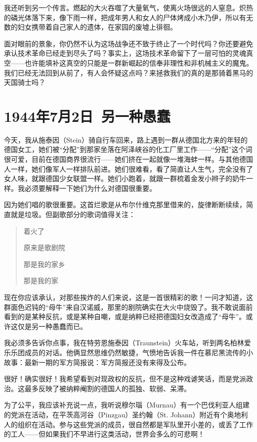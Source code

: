 \documentclass[UTF8]{ctexart}
\begin{document}
我还听到另一个传言。燃起的大火吞噬了大量氧气，使离火场很远的人窒息。炽热的磷光体落下来，像下雨一样，把成年男人和女人的尸体烤成小木乃伊，所以有无数的妇女携带着自己家人的遗体，在家园的废墟上徘徊。

面对眼前的景象，你仍然不认为这场战争还不致于终止了一个时代吗？你还要避免承认技术革命已经走到尽头了吗？事实上，这场技术革命留下了一层可怕的灵魂真空——也许能填补这真空的只能是一群新崛起的信奉非理性和非机械主义的魔鬼。我们已经无法回到从前了，有人会怀疑这点吗？来拯救我们的真的是那骑着黑马的天国骑士吗？

\section{1944年7月2日\ 另一种愚蠢}

今天，我从施泰因（Stein）骑自行车回来，路上遇到一群从德国北方来的年轻的德国女工，她们被“分配”到那家坐落在阿泽峡谷的化工厂里工作——“分配”这个词很可爱，目前在德国商界很流行——她们挤在一起就像一堆海蚌一样。与其他德国人一样，她们像军人一样排队前进。她们很难看，看了简直让人生气，完全没有了女人味，就跟德国少女联盟一样。她们小跑着，就跟一群梳着金发小辫子的奶牛一样。我必须要解释一下她们为什么对德国很重要。

因为她们唱的歌很重要。这首烂歌是从布尔什维克那里借来的，旋律断断续续，简直就是垃圾。但副歌部分的歌词值得关注：

\begin{verse}
着火了

原来是歌剧院

那是我的家乡

那是我的家
\end{verse}

现在你应该承认，对那些挨炸的人们来说，这是一首很精彩的歌！一问才知道，这群面色迟钝的“母牛”来自汉诺威，那里的剧院确实在大火中烧毁了。我不敢说面前看到的是某种反抗，或是某种自嘲，或是纳粹已经把德国妇女改造成了“母牛”。或许这仅是另一种愚蠢而已。

我必须多告诉你点事，我在特劳恩施泰因（Traunstein）火车站，听到两名柏林爱乐乐团成员的对话。他俩显然思维仍然敏捷，气愤地告诉我一件在慕尼黑流传的小故事：最新一期的军方简报说：军方简报还没有来得及公布。

很好！确实很好！我希望看到对现政权的反抗，但不是这种戏谑笑话，而是党派政治。这最多反映了被纳粹阉割的德国人的孤独、软弱、呆滞。

为了公平，我应该补充说一点，我听说穆尔瑙（Murnau）有一个巴伐利亚人组建的党派在活动，在平茨高河谷（Pinzgau）圣约翰（St. Johann）附近有个奥地利人的组织在活动。参与这些党派的成员，很自然都是军队里开小差的，或丢了工作的工人——但如果我们不早进行这类活动，世界会多么的可悲啊！
\end{document}
